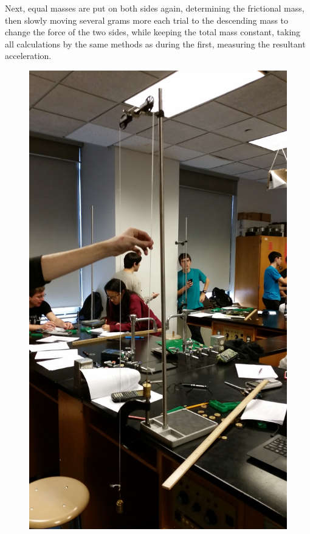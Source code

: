 \documentclass[11pt, titlepage]{article}
\begin{document}
Next, equal masses are put on both sides again, determining the frictional mass, then slowly moving several grams more each trial to the descending mass to change the force of the two sides, while keeping the total mass constant, taking all calculations by the same methods as during the first, measuring the resultant acceleration.

\begin{figure}[p]
\centering
\hspace*{-10.5cm}
\includegraphics[scale=0.15, angle=270]{lab1.jpg}
\vspace*{19cm}
\end{figure}
\end{document}

